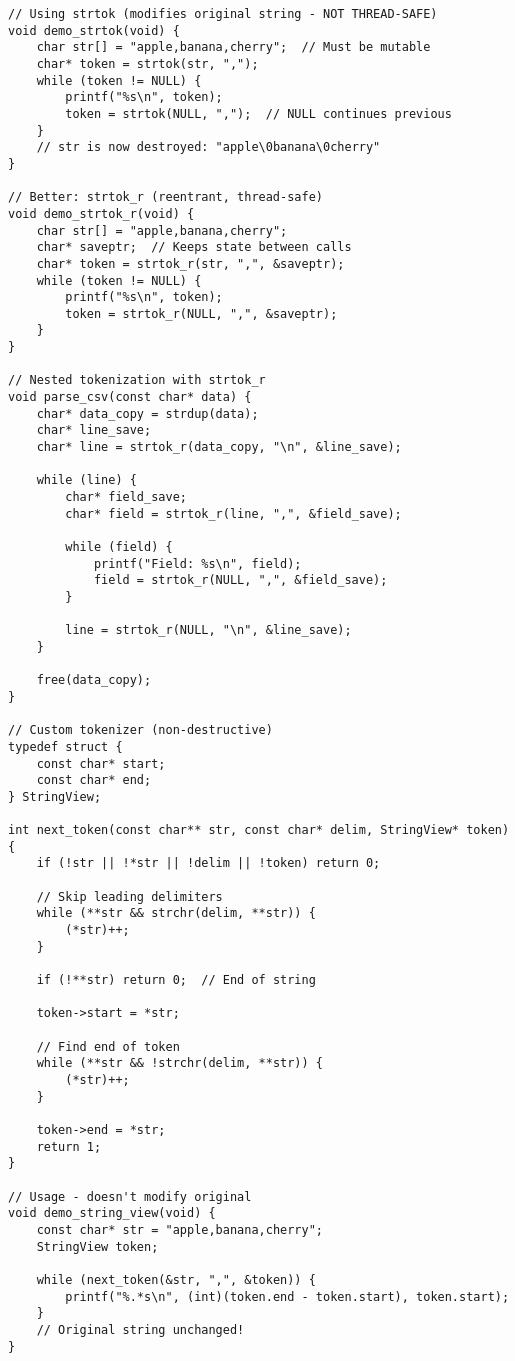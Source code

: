 \begin{lstlisting}
// Using strtok (modifies original string - NOT THREAD-SAFE)
void demo_strtok(void) {
    char str[] = "apple,banana,cherry";  // Must be mutable
    char* token = strtok(str, ",");
    while (token != NULL) {
        printf("%s\n", token);
        token = strtok(NULL, ",");  // NULL continues previous
    }
    // str is now destroyed: "apple\0banana\0cherry"
}

// Better: strtok_r (reentrant, thread-safe)
void demo_strtok_r(void) {
    char str[] = "apple,banana,cherry";
    char* saveptr;  // Keeps state between calls
    char* token = strtok_r(str, ",", &saveptr);
    while (token != NULL) {
        printf("%s\n", token);
        token = strtok_r(NULL, ",", &saveptr);
    }
}

// Nested tokenization with strtok_r
void parse_csv(const char* data) {
    char* data_copy = strdup(data);
    char* line_save;
    char* line = strtok_r(data_copy, "\n", &line_save);

    while (line) {
        char* field_save;
        char* field = strtok_r(line, ",", &field_save);

        while (field) {
            printf("Field: %s\n", field);
            field = strtok_r(NULL, ",", &field_save);
        }

        line = strtok_r(NULL, "\n", &line_save);
    }

    free(data_copy);
}

// Custom tokenizer (non-destructive)
typedef struct {
    const char* start;
    const char* end;
} StringView;

int next_token(const char** str, const char* delim, StringView* token) {
    if (!str || !*str || !delim || !token) return 0;

    // Skip leading delimiters
    while (**str && strchr(delim, **str)) {
        (*str)++;
    }

    if (!**str) return 0;  // End of string

    token->start = *str;

    // Find end of token
    while (**str && !strchr(delim, **str)) {
        (*str)++;
    }

    token->end = *str;
    return 1;
}

// Usage - doesn't modify original
void demo_string_view(void) {
    const char* str = "apple,banana,cherry";
    StringView token;

    while (next_token(&str, ",", &token)) {
        printf("%.*s\n", (int)(token.end - token.start), token.start);
    }
    // Original string unchanged!
}
\end{lstlisting}

